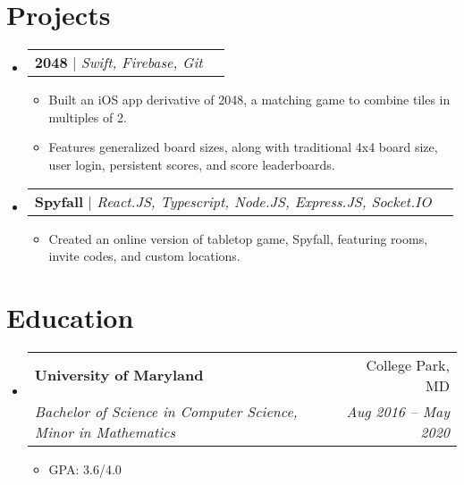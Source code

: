 \documentclass[letterpaper,11pt]{article}
\makeatletter
\newcommand{\resumeItem}[1]{
  \item\small{
    {#1 \vspace{-2pt}}
  }
}
\newcommand{\resumeSubheading}[4]{
  \vspace{-2pt}\item
    \begin{tabular*}{0.97\textwidth}[t]{l@{\extracolsep{\fill}}r}
      \textbf{#1} & #2 \\
      \textit{\small#3} & \textit{\small #4} \\
    \end{tabular*}\vspace{-7pt}
}
\newcommand{\resumeProjectHeading}[2]{
    \item
    \begin{tabular*}{0.97\textwidth}{l@{\extracolsep{\fill}}r}
      \small#1 & #2 \\
    \end{tabular*}\vspace{-7pt}
}
\newcommand{\resumeSubHeadingListStart}{\begin{itemize}[leftmargin=0.15in, label={}]}
\newcommand{\resumeSubHeadingListEnd}{\end{itemize}}
\newcommand{\resumeItemListStart}{\begin{itemize}}
\newcommand{\resumeItemListEnd}{\end{itemize}\vspace{-5pt}}
\makeatother
\begin{document}
\section{Projects}
\resumeSubHeadingListStart
  \resumeProjectHeading
    {\textbf{2048} $|$ \emph{Swift, Firebase, Git}}{}
    \resumeItemListStart
      \resumeItem {Built an iOS app derivative of 2048, a matching game to combine tiles in multiples of 2.}
      \resumeItem {Features generalized board sizes, along with traditional 4x4 board size, user login, persistent scores, and score leaderboards.}
    \resumeItemListEnd
  \resumeProjectHeading
      {\textbf{Spyfall} $|$ \emph{React.JS, Typescript, Node.JS, Express.JS, Socket.IO}}{}
      \resumeItemListStart
        \resumeItem {Created an online version of tabletop game, Spyfall, featuring rooms, invite codes, and custom locations.}
      \resumeItemListEnd
\resumeSubHeadingListEnd

\section{Education}
  \resumeSubHeadingListStart
    \resumeSubheading
      {University of Maryland}{College Park, MD}
      {Bachelor of Science in Computer Science, Minor in Mathematics}{Aug 2016 -- May 2020}
      \resumeItemListStart
        \resumeItem {GPA: 3.6/4.0}
      \resumeItemListEnd
  \resumeSubHeadingListEnd

\end{document}
